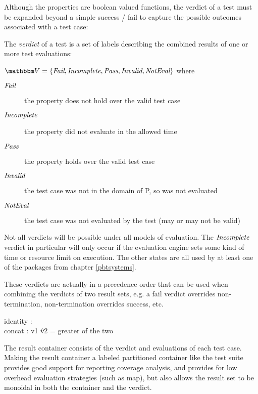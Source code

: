 Although the properties are boolean valued functions,
the verdict of a test must be expanded beyond a simple success / fail
to capture the possible outcomes associated with a test case:

\begin{df}[Verdicts]
    The \emph{verdict} of a test is a set of labels describing the combined results of one or more test evaluations:
    
    $\verdictset = \{ \fail, \nonterm, \success, \invalid, \noteval \}$ where
    
    \begin{description}
        \item[$\emph{Fail}$] the property does not hold over the valid test case
        \item[$\emph{Incomplete}$] the property did not evaluate in the allowed time
        \item[$\emph{Pass}$] the property holds over the valid test case
        \item[$\emph{Invalid}$] the test case was not in the domain of P, so was not evaluated
        \item[$\emph{NotEval}$] the test case was not evaluated by the test (may or may not be valid)
    \end{description}
\end{df}

Not all verdicts will be possible under all models of evaluation.
The $\emph{Incomplete}$ verdict in particular will only occur if the evaluation engine 
sets some kind of time or resource limit on execution.
The other states are all used by at least one of the packages from chapter \ref{pbtsystems}.

These verdicts are actually in a precedence order that can be used when combining 
the verdicts of two result sets,
e.g. a fail verdict overrides non-termination, non-termination overrides success, etc.
\begin{df}
    identity : \noteval \\
    concat : v1 \^ v2 = greater of the two\\
\end{df}

The result container consists of the verdict and evaluations of each test case.
Making the result container a labeled partitioned container like the test suite
provides good support for reporting coverage analysis,
and provides for low overhead evaluation strategies (such as map),
but also allows the result set to be monoidal in both the container and the verdict.

